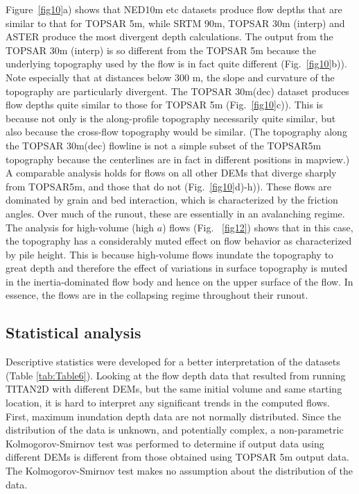 \documentclass[12pt,letterpaper]{article}
\begin{document}
Figure~\ref{fig10}a) shows that NED10m etc datasets produce flow depths that are similar to that for TOPSAR 5m, while SRTM 90m, TOPSAR 30m (interp) and ASTER produce the most divergent depth calculations.  The output from the TOPSAR 30m (interp) is so different from the TOPSAR 5m because the underlying topography used by the flow is in fact quite different (Fig.~\ref{fig10}b)). Note especially that at distances below 300 m, the slope and curvature of the topography are particularly divergent. The TOPSAR 30m(dec) dataset produces flow depths quite similar to those for TOPSAR 5m (Fig.~\ref{fig10}c)). This is because not only is the along-profile topography necessarily quite similar, but also because the cross-flow topography would be similar.  (The topography along the TOPSAR 30m(dec) flowline is not a simple subset of the TOPSAR5m topography because the centerlines are in fact in different positions in mapview.)  A comparable analysis holds for flows on all other DEMs that diverge sharply from TOPSAR5m, and those that do not (Fig.~\ref{fig10}d)-h)). These flows are dominated by grain and bed  interaction, which is characterized by the friction angles.  Over much of the runout, these are essentially in an avalanching regime.  
The analysis for high-volume (high $a$) flows (Fig. ~\ref{fig12}) shows that in this case, the topography has a considerably muted effect on flow behavior as characterized by pile height.   This is because high-volume flows inundate the topography to great depth and therefore the effect of variations in surface topography is muted in the inertia-dominated flow body  and hence on the upper surface of the flow.  In essence, the flows are in the collapsing regime throughout their runout. 

\subsection{Statistical analysis}

 Descriptive statistics were developed for a better
  interpretation of the datasets (Table \ref{tab:Table6}).  Looking at
  the flow depth data that resulted from running TITAN2D with
  different DEMs, but the same initial volume and same starting
  location, it is hard to interpret any significant trends in the
  computed flows.  First, maximum inundation depth data are not
  normally distributed.  Since the distribution of the data is unknown, and potentially complex, a non-parametric 
  Kolmogorov-Smirnov test was performed to determine if output data
  using different DEMs is different from those obtained using TOPSAR
  5m output data. The Kolmogorov-Smirnov test makes no assumption
  about the distribution of the data.
\end{document}
